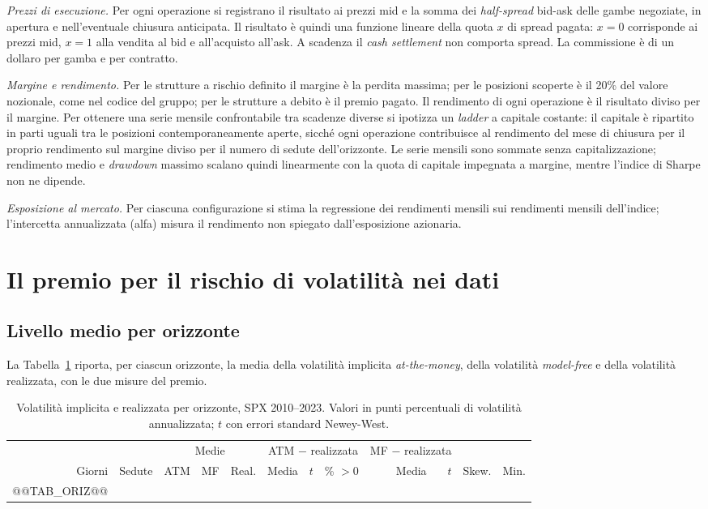 \documentclass[11pt,a4paper]{article}
\begin{document}
\emph{Prezzi di esecuzione.} Per ogni operazione si registrano il risultato ai prezzi mid e la somma dei \emph{half-spread} bid-ask delle gambe negoziate, in apertura e nell'eventuale chiusura anticipata. Il risultato è quindi una funzione lineare della quota $x$ di spread pagata: $x=0$ corrisponde ai prezzi mid, $x=1$ alla vendita al bid e all'acquisto all'ask. A scadenza il \emph{cash settlement} non comporta spread. La commissione è di un dollaro per gamba e per contratto.

\emph{Margine e rendimento.} Per le strutture a rischio definito il margine è la perdita massima; per le posizioni scoperte è il 20\% del valore nozionale, come nel codice del gruppo; per le strutture a debito è il premio pagato. Il rendimento di ogni operazione è il risultato diviso per il margine. Per ottenere una serie mensile confrontabile tra scadenze diverse si ipotizza un \emph{ladder} a capitale costante: il capitale è ripartito in parti uguali tra le posizioni contemporaneamente aperte, sicché ogni operazione contribuisce al rendimento del mese di chiusura per il proprio rendimento sul margine diviso per il numero di sedute dell'orizzonte. Le serie mensili sono sommate senza capitalizzazione; rendimento medio e \emph{drawdown} massimo scalano quindi linearmente con la quota di capitale impegnata a margine, mentre l'indice di Sharpe non ne dipende.

\emph{Esposizione al mercato.} Per ciascuna configurazione si stima la regressione dei rendimenti mensili sui rendimenti mensili dell'indice; l'intercetta annualizzata (alfa) misura il rendimento non spiegato dall'esposizione azionaria.

\section{Il premio per il rischio di volatilità nei dati}\label{sec:vrp}

\subsection{Livello medio per orizzonte}

La Tabella~\ref{tab:oriz} riporta, per ciascun orizzonte, la media della volatilità implicita \emph{at-the-money}, della volatilità \emph{model-free} e della volatilità realizzata, con le due misure del premio.

\begin{table}[ht]\centering\small
\caption{Volatilità implicita e realizzata per orizzonte, SPX 2010--2023. Valori in punti percentuali di volatilità annualizzata; $t$ con errori standard Newey-West.}\label{tab:oriz}
\begin{tabular}{rrrrrrrrrrrr}\toprule
 & & \multicolumn{3}{c}{Medie} & \multicolumn{3}{c}{ATM $-$ realizzata} & \multicolumn{2}{c}{MF $-$ realizzata} & & \\ \cmidrule(lr){3-5}\cmidrule(lr){6-8}\cmidrule(lr){9-10}
Giorni & Sedute & ATM & MF & Real. & Media & $t$ & \% $>0$ & Media & $t$ & Skew. & Min. \\ \midrule
@@TAB_ORIZ@@
\bottomrule\end{tabular}\end{table}
\end{document}
